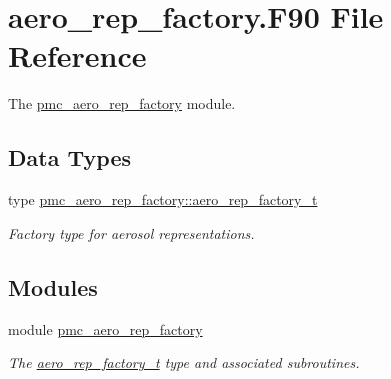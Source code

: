 \hypertarget{aero__rep__factory_8_f90}{}\section{aero\+\_\+rep\+\_\+factory.\+F90 File Reference}
\label{aero__rep__factory_8_f90}


The \mbox{\hyperlink{namespacepmc__aero__rep__factory}{pmc\+\_\+aero\+\_\+rep\+\_\+factory}} module.  


\subsection*{Data Types}
\begin{DoxyCompactItemize}
\item 
type \mbox{\hyperlink{structpmc__aero__rep__factory_1_1aero__rep__factory__t}{pmc\+\_\+aero\+\_\+rep\+\_\+factory\+::aero\+\_\+rep\+\_\+factory\+\_\+t}}
\begin{DoxyCompactList}\small\item\em Factory type for aerosol representations. \end{DoxyCompactList}\end{DoxyCompactItemize}
\subsection*{Modules}
\begin{DoxyCompactItemize}
\item 
module \mbox{\hyperlink{namespacepmc__aero__rep__factory}{pmc\+\_\+aero\+\_\+rep\+\_\+factory}}
\begin{DoxyCompactList}\small\item\em The \mbox{\hyperlink{structpmc__aero__rep__factory_1_1aero__rep__factory__t}{aero\+\_\+rep\+\_\+factory\+\_\+t}} type and associated subroutines. \end{DoxyCompactList}\end{DoxyCompactItemize}
